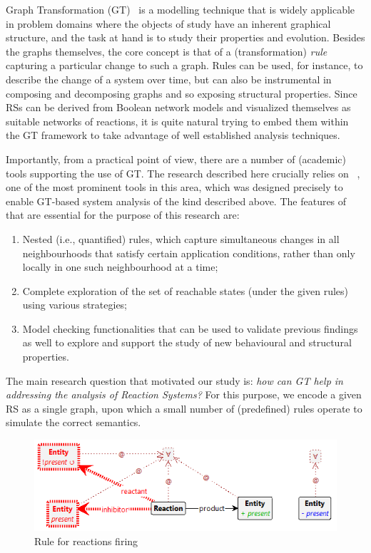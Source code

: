 Graph Transformation (GT)~\cite{DBLP:series/eatcs/EhrigEPT06,DBLP:books/sp/HeckelT20} is a modelling technique that is widely applicable in problem domains where the objects of study have an inherent graphical structure, and the task at hand is to study their properties and evolution. Besides the graphs themselves, the core concept is that of a (transformation) \emph{rule} capturing a particular change to such a graph. Rules can be used, for instance, to describe the change of a system over time, but can also be instrumental in composing and decomposing graphs and so exposing structural properties.
Since RSs can be derived from Boolean network models and visualized themselves as suitable networks of reactions, it is quite natural trying to embed them within the GT framework to take advantage of well established analysis techniques.

Importantly, from a practical point of view, there are a number of (academic) tools supporting the use of GT. The research described here crucially relies on \href{https://groove.cs.utwente.nl}{\GROOVE}~\cite{DBLP:journals/sttt/GhamarianMRZZ12}, one of the most prominent tools in this area, which was designed precisely to enable GT-based system analysis of the kind described above. The features of \GROOVE that are essential for the purpose of this research are:
\begin{enumerate}%
\item Nested (i.e., quantified) rules, which capture simultaneous changes in all neighbourhoods that satisfy certain application conditions, rather than only locally in one such neighbourhood at a time; 
\item Complete exploration of the set of reachable states (under the given rules) using various strategies;
\item Model checking functionalities that can be used to validate previous findings as well to explore and support the study of new behavioural and structural properties.
\end{enumerate}

The main research question that motivated our study is: 
\emph{how can GT help in addressing the analysis of Reaction Systems?} 
For this purpose, we encode a given RS as a single graph, upon which a small number of (predefined) rules operate to simulate the correct semantics. 

\begin{figure}
\centering
\includegraphics[scale=.40]{react}
\caption{Rule for reactions firing}
\label{fig:reactionfiring}
\end{figure}

